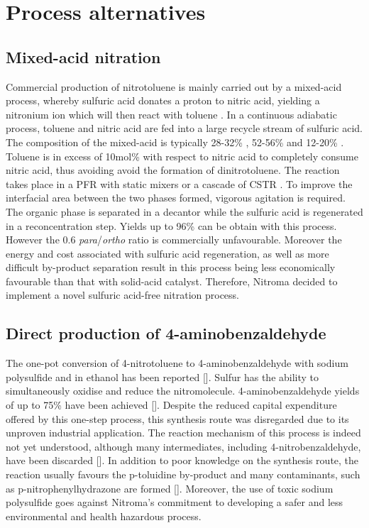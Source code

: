 \section{Process alternatives}
\label{app:alternatives}

\subsection{Mixed-acid nitration}
Commercial production of nitrotoluene is mainly carried out by a mixed-acid process, whereby sulfuric acid donates a proton to nitric acid, yielding a nitronium ion which will then react with toluene \cite{halder_nitration_2007}. In a continuous adiabatic process, toluene and nitric acid are fed into a large recycle stream of sulfuric acid. The composition of the mixed-acid is typically 28-32\% , 52-56\%  and 12-20\%  \cite{dugal_nitrobenzene_2005}. Toluene is in excess of 10mol\% with respect to nitric acid to completely consume nitric acid, thus avoiding avoid the formation of dinitrotoluene. The reaction takes place in a PFR with static mixers or a cascade of CSTR \cite{dugal_nitrobenzene_2005}. To improve the interfacial area between the two phases formed, vigorous agitation is required. The organic phase is separated in a decantor while the sulfuric acid is regenerated in a reconcentration step. Yields up to 96\% can be obtain with this process. However the 0.6 \textit{para}/\textit{ortho} ratio is commercially unfavourable. Moreover the energy and cost associated with sulfuric acid regeneration, as well as more difficult by-product separation result in this process being less economically favourable than that with solid-acid catalyst. Therefore, Nitroma decided to implement a novel sulfuric acid-free nitration process.



\subsection{Direct production of 4-aminobenzaldehyde}
The one-pot conversion of 4-nitrotoluene to 4-aminobenzaldehyde with sodium polysulfide and  in ethanol has been reported []. Sulfur has the ability to simultaneously oxidise and reduce the nitromolecule. 4-aminobenzaldehyde yields of up to 75\% have been achieved []. Despite the reduced capital expenditure offered by this one-step process, this synthesis route was disregarded due to its unproven industrial application. The reaction mechanism of this process is indeed not yet understood, although many intermediates, including 4-nitrobenzaldehyde, have been discarded []. In addition to poor knowledge on the synthesis route, the reaction usually favours the p-toluidine by-product and many contaminants, such as p-nitrophenylhydrazone are formed []. Moreover, the use of toxic sodium polysulfide goes against Nitroma's commitment to developing a safer and less environmental and health hazardous process.


